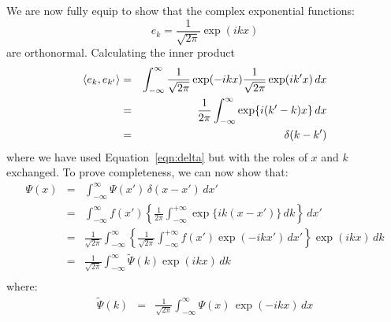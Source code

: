 \documentclass[12pt]{book}
\begin{document}
We are now fully equip to show that the complex exponential functions:
\begin{equation*}
e_k = \frac{1}{\sqrt{2\pi}} \exp(i k x)
\end{equation*}
are orthonormal.  Calculating the inner product
\begin{eqnarray*}
\braket{e_k, e_{k'}} &=& \int_{-\infty}^{\infty} \frac{1}{\sqrt{2 \pi}}  \exp(-ikx) \frac{1}{\sqrt{2 \pi}}  \exp(ik'x) \, dx \\
                               &=& \frac{1}{2 \pi} \int_{-\infty}^{\infty} \exp\{i(k'-k)x\} \, dx \\
                               &=& \delta(k-k')
\end{eqnarray*}
where we have used Equation~\ref{eqn:delta} but with the roles of $x$ and $k$ exchanged.
To prove completeness, we can now show that:
\begin{eqnarray*}
\Psi(x) &=& \int_{-\infty}^{\infty} \Psi(x') \, \delta(x-x') \, dx' \\
&=& \int_{-\infty}^{\infty} f(x') \left\{ \frac{1}{2 \pi} \int_{-\infty}^{+\infty} \exp\{ik(x-x')\} \, dk \right\} \, dx' \\
&=& \frac{1}{\sqrt{2 \pi}} \int_{-\infty}^{\infty} \left\{ \frac{1}{\sqrt{2 \pi}} \int_{-\infty}^{+\infty} f(x') \exp(-ikx') \, dx' \right\}  \exp(ikx) \, dk \\
&=& \frac{1}{\sqrt{2 \pi}} \int_{-\infty}^{\infty} \widetilde{\Psi}(k)  \exp(ikx) \, dk \\
\end{eqnarray*}
where:
\begin{eqnarray*}
\widetilde{\Psi}(k) &=& \frac{1}{\sqrt{2\pi}} \int_{-\infty}^{\infty} \Psi(x) \, \exp(-ikx) \, dx \\
\end{eqnarray*}
\end{document}
